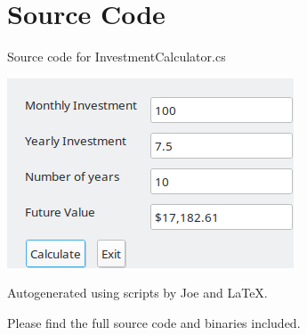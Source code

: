 \documentclass[12pt]{article}
\begin{document}
\maketitle
\pagebreak


\section{Source Code}

Source code for \textsf{InvestmentCalculator.cs}


\newpage


\includegraphics{scr.png}

\newpage

Autogenerated using scripts by Joe and \LaTeX.

Please find the full source code and binaries included.
\end{document}

